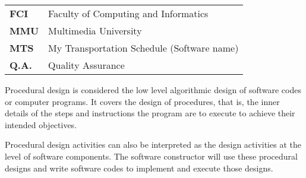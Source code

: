 \documentclass[12pt, oneside]{Thesis}
\begin{document}
\lstlistoflistings


\pagebreak
{} 


\begin{table}[ht]
\begin{tabular}{p{2.5cm}p{11.0cm}}

\textbf{FCI} & Faculty of Computing and Informatics\\
\textbf{MMU} & Multimedia University\\
\textbf{MTS} & My Transportation Schedule (Software name)\\
\textbf{Q.A.} & Quality Assurance\\
\end{tabular}
\end{table}


\pagebreak
{} 

Procedural design is considered the low level algorithmic design of software codes or computer programs. It covers the design of procedures, that is, the inner details of the steps and instructions the program are to execute to achieve their intended objectives. 

Procedural design activities can also be interpreted as the design activities at the level of software components. The software constructor will use these procedural designs and write software codes to implement and execute those designs. 



\clearpage %
\pagebreak

\mainmatter 
\end{document}
